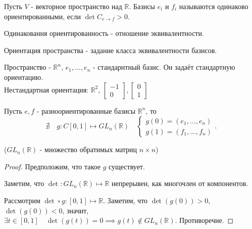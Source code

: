 \begin{definition} \thmslashn 

    Пусть $V$ - векторное пространство над $\mathbb{R}$. Базисы $e_{i}$ и $f_{i}$ называются одинаково ориентированными, если $\det C_{e\to f} > 0$.

    Одинаковання ориентированность - отношение эквивалентности.
\end{definition}
\begin{definition} \thmslashn 

    Ориентация пространства - задание класса эквивалентности базисов.
\end{definition}
\begin{example} \thmslashn

    Пространство - $\mathbb{R}^{n}$, $e_1, \ldots, e_{n}$ - стандарнтный базис. Он задаёт стандартную ориентацию.\\

    Нестандартная ориентация: $\mathbb{R}^2$, $\begin{bmatrix} -1\\ 0 \end{bmatrix}, \begin{bmatrix} 0\\ 1 \end{bmatrix}  $
\end{example}
\begin{statement} \thmslashn

    Пусть $e, f$ - разноориентированные базисы $\mathbb{R}^{n}$, то
    \[ \nexists\quad g : C[0, 1] \mapsto  GL_{n}(\mathbb{R})\quad \begin{cases}
        g(0) = (e_1, \ldots, e_{n})\\
        g(1) = (f_1, \ldots, f_{n})
    \end{cases} .\] 

    ($GL_{n}(\mathbb{R})$ - множество обратимых матриц $n \times n$)
    \begin{proof} \thmslashn
    
        Предположим, что такое $g$ существует.

        Заметим, что $\det : GL_{n}(\mathbb{R}) \mapsto \mathbb{R}$ непрерывен, как многочлен от компонентов.

        Рассмотрим $\det \circ g : [0, 1] \mapsto \mathbb{R}$. Заметим, что $\det(g(0)) > 0$, $\det(g(0)) < 0$, значит, $\exists{t\in [0, 1]}\quad \det(g(t)) = 0 \implies g(t) \not\in GL_{n}(\mathbb{R})$. Противоречие.
    \end{proof}
\end{statement}
